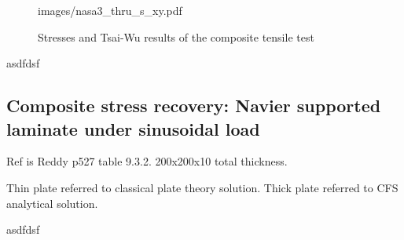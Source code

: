 \begin{figure}[H]
{		{images/nasa3_thru_s_xy.pdf}}
	\caption{\label{Nasa3_stresses}Stresses and Tsai-Wu results of the composite tensile test}
\end{figure}

asdfdsf

\subsection{Composite stress recovery: Navier supported laminate under sinusoidal load}

Ref is Reddy p527 table 9.3.2. 200x200x10 total thickness. 


Thin plate referred to classical plate theory solution. Thick plate referred to CFS analytical solution.

asdfdsf

